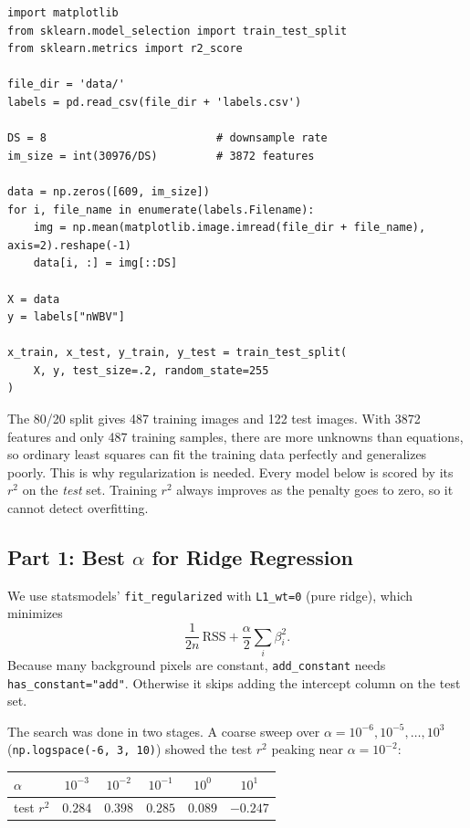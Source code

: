 \documentclass[11pt]{article}
\begin{document}
\begin{lstlisting}
import matplotlib
from sklearn.model_selection import train_test_split
from sklearn.metrics import r2_score

file_dir = 'data/'
labels = pd.read_csv(file_dir + 'labels.csv')

DS = 8                          # downsample rate
im_size = int(30976/DS)         # 3872 features

data = np.zeros([609, im_size])
for i, file_name in enumerate(labels.Filename):
    img = np.mean(matplotlib.image.imread(file_dir + file_name), axis=2).reshape(-1)
    data[i, :] = img[::DS]

X = data
y = labels["nWBV"]

x_train, x_test, y_train, y_test = train_test_split(
    X, y, test_size=.2, random_state=255
)
\end{lstlisting}

The 80/20 split gives 487 training images and 122 test images. With 3872 features
and only 487 training samples, there are more unknowns than equations, so ordinary least
squares can fit the training data perfectly and generalizes poorly. This is why
regularization is needed. Every model below is scored by its $r^2$ on the
\emph{test} set. Training $r^2$ always improves as the penalty goes to zero, so it cannot
detect overfitting.

\subsection*{Part 1: Best $\alpha$ for Ridge Regression}

We use statsmodels' \texttt{fit\_regularized} with \texttt{L1\_wt=0} (pure ridge),
which minimizes
\[
  \frac{1}{2n}\,\text{RSS} + \frac{\alpha}{2}\sum_i \beta_i^2 .
\]
Because many background pixels are constant, \texttt{add\_constant} needs
\texttt{has\_constant="add"}. Otherwise it skips adding the intercept column on the
test set.

The search was done in two stages. A coarse sweep over
$\alpha = 10^{-6}, 10^{-5}, \dots, 10^{3}$ (\texttt{np.logspace(-6, 3, 10)}) showed the
test $r^2$ peaking near $\alpha = 10^{-2}$:

\begin{center}
\begin{tabular}{lccccc}
\toprule
$\alpha$ & $10^{-3}$ & $10^{-2}$ & $10^{-1}$ & $10^{0}$ & $10^{1}$ \\
\midrule
test $r^2$ & $0.284$ & $0.398$ & $0.285$ & $0.089$ & $-0.247$ \\
\bottomrule
\end{tabular}
\end{center}
\end{document}
